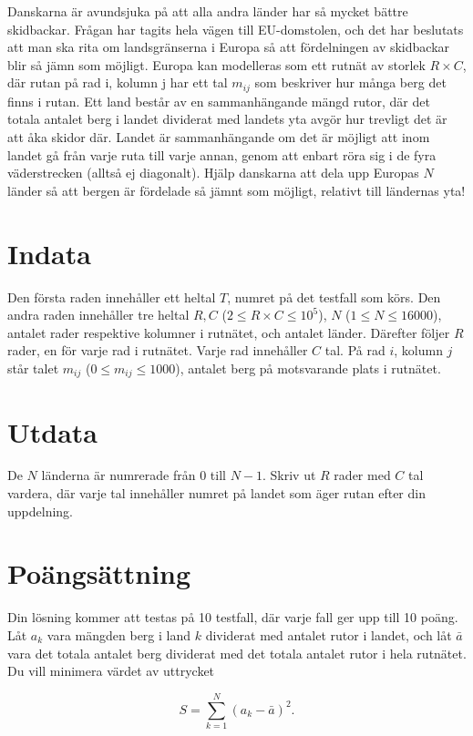
\noindent Danskarna är avundsjuka på att alla andra länder har så mycket bättre skidbackar. 
Frågan har tagits hela vägen till EU-domstolen, 
och det har beslutats att man ska rita om landsgränserna i Europa så att fördelningen 
av skidbackar blir så jämn som möjligt. Europa kan modelleras som ett rutnät av storlek $R \times C$,
där rutan på rad i, kolumn j har ett tal $m_{ij}$ som beskriver 
hur många berg det finns i rutan.
Ett land består av en sammanhängande mängd rutor,
där det totala antalet berg i landet dividerat med landets
yta avgör hur trevligt det är att åka skidor där. 
Landet är sammanhängande om det är möjligt att inom landet gå 
från varje ruta till varje annan, genom att enbart röra sig i de fyra väderstrecken (alltså ej diagonalt).
Hjälp danskarna att dela upp Europas $N$ länder så att 
bergen är fördelade så jämnt som möjligt, relativt till ländernas yta!


\section*{Indata}
Den första raden innehåller ett heltal $T$, numret på det testfall som körs.
Den andra raden innehåller tre heltal 
$R, C$ ($2 \le R \times C \le 10^5$), $N$ ($1 \le N \le 16000$), 
antalet rader respektive kolumner i rutnätet,
och antalet länder.
Därefter följer $R$ rader, en för varje rad i rutnätet. 
Varje rad innehåller $C$ tal. På rad $i$, kolumn $j$ 
står talet $m_{ij}$ ($0 \leq m_{ij} \leq 1000$), 
antalet berg på motsvarande plats i rutnätet.

\section*{Utdata}
De $N$ länderna är numrerade från $0$ till $N - 1$. Skriv ut $R$ rader med $C$ tal vardera, där varje tal innehåller numret på landet som äger rutan efter din uppdelning.


\section*{Poängsättning}
Din lösning kommer att testas på 10 testfall, 
där varje fall ger upp till 10 poäng. 
Låt $a_k$ vara mängden berg i land $k$ dividerat med antalet rutor i landet, 
och låt $\bar{a}$ vara det totala antalet berg dividerat med det totala antalet rutor i hela rutnätet.
Du vill minimera värdet av uttrycket 


\[
S = \sum_{k=1}^{N}{(a_k - \bar{a})^2}. 
\]

